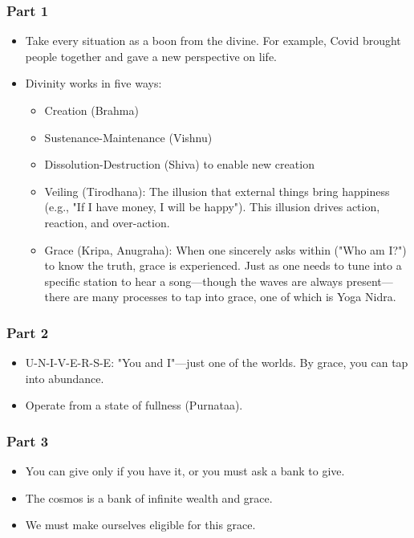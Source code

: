 \begin{frame}[fragile]\frametitle{Part 1}

\begin{itemize}
    \item Take every situation as a boon from the divine. For example, Covid brought people together and gave a new perspective on life.
    \item Divinity works in five ways:
    \begin{itemize}
        \item Creation (Brahma)
        \item Sustenance-Maintenance (Vishnu)
        \item Dissolution-Destruction (Shiva) to enable new creation
        \item Veiling (Tirodhana): The illusion that external things bring happiness (e.g., "If I have money, I will be happy"). This illusion drives action, reaction, and over-action.
        \item Grace (Kripa, Anugraha): When one sincerely asks within ("Who am I?") to know the truth, grace is experienced. Just as one needs to tune into a specific station to hear a song—though the waves are always present—there are many processes to tap into grace, one of which is Yoga Nidra.
    \end{itemize}
\end{itemize}

\end{frame}

\begin{frame}[fragile]\frametitle{Part 2}

\begin{itemize}
    \item U-N-I-V-E-R-S-E: "You and I"—just one of the worlds. By grace, you can tap into abundance.
    \item Operate from a state of fullness (Purnataa).
\end{itemize}

\end{frame}

\begin{frame}[fragile]\frametitle{Part 3}

\begin{itemize}
    \item You can give only if you have it, or you must ask a bank to give.
    \item The cosmos is a bank of infinite wealth and grace.
    \item We must make ourselves eligible for this grace.
\end{itemize}

\end{frame}

